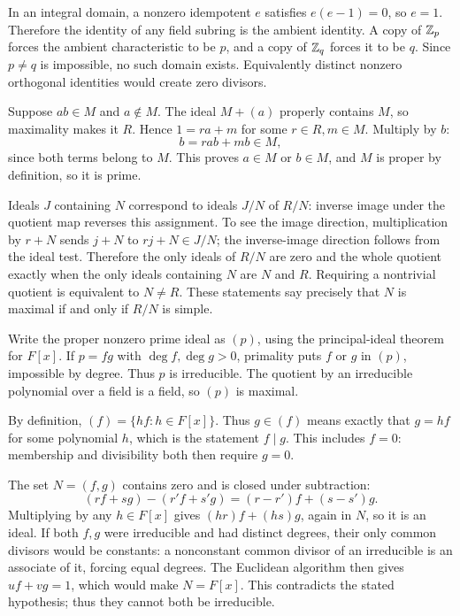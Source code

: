 In an integral domain, a nonzero idempotent $e$ satisfies $e(e-1)=0$, so $e=1$. Therefore the identity of any field subring is the ambient identity. A copy of $\mathbb{Z}_p$ forces the ambient characteristic to be $p$, and a copy of $\mathbb{Z}_q$ forces it to be $q$. Since $p\ne q$ is impossible, no such domain exists. Equivalently distinct nonzero orthogonal identities would create zero divisors.

Suppose $ab\in M$ and $a\notin M$. The ideal $M+(a)$ properly contains $M$, so maximality makes it $R$. Hence $1=ra+m$ for some $r\in R,m\in M$. Multiply by $b$:
\[b=rab+mb\in M,\]
since both terms belong to $M$. This proves $a\in M$ or $b\in M$, and $M$ is proper by definition, so it is prime.

Ideals $J$ containing $N$ correspond to ideals $J/N$ of $R/N$: inverse image under the quotient map reverses this assignment. To see the image direction, multiplication by $r+N$ sends $j+N$ to $rj+N\in J/N$; the inverse-image direction follows from the ideal test.
Therefore the only ideals of $R/N$ are zero and the whole quotient exactly when the only ideals containing $N$ are $N$ and $R$. Requiring a nontrivial quotient is equivalent to $N\ne R$. These statements say precisely that $N$ is maximal if and only if $R/N$ is simple.

Write the proper nonzero prime ideal as $(p)$, using the principal-ideal theorem for $F[x]$. If $p=fg$ with $\deg f,\deg g>0$, primality puts $f$ or $g$ in $(p)$, impossible by degree. Thus $p$ is irreducible. The quotient by an irreducible polynomial over a field is a field, so $(p)$ is maximal.

By definition, $(f)=\{hf:h\in F[x]\}$. Thus $g\in(f)$ means exactly that $g=hf$ for some polynomial $h$, which is the statement $f\mid g$. This includes $f=0$: membership and divisibility both then require $g=0$.

The set $N=(f,g)$ contains zero and is closed under subtraction:
\[(rf+sg)-(r'f+s'g)=(r-r')f+(s-s')g.\]
Multiplying by any $h\in F[x]$ gives $(hr)f+(hs)g$, again in $N$, so it is an ideal.
If both $f,g$ were irreducible and had distinct degrees, their only common divisors would be constants: a nonconstant common divisor of an irreducible is an associate of it, forcing equal degrees. The Euclidean algorithm then gives $uf+vg=1$, which would make $N=F[x]$. This contradicts the stated hypothesis; thus they cannot both be irreducible.

